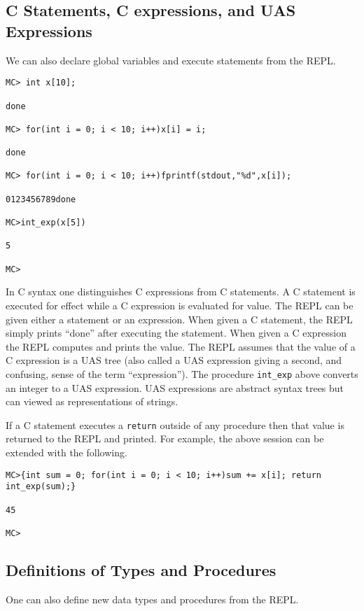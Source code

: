 \documentclass{article}
\begin{document}
\subsection{C Statements, C expressions, and UAS Expressions}

We can also declare global variables and execute statements from the REPL.

\begin{verbatim}
MC> int x[10];

done

MC> for(int i = 0; i < 10; i++)x[i] = i;

done

MC> for(int i = 0; i < 10; i++)fprintf(stdout,"%d",x[i]);

0123456789done

MC>int_exp(x[5])

5

MC>
\end{verbatim}

In C syntax one distinguishes C expressions from C statements.  A C
statement is executed for effect while a C expression is evaluated for
value. The REPL can be given either a statement or an expression.  When
given a C statement, the REPL simply prints ``done'' after executing
the statement.
When given a C expression the REPL computes and prints
the value.  The REPL assumes that the value of a C expression
is a UAS tree (also called a UAS expression giving a second, and confusing,
sense of the term ``expression''). The procedure {\tt int\_exp} above
converts an integer to a UAS expression.  UAS expressions are abstract
syntax trees but can viewed as representations of strings.

If a C statement executes a {\tt return} outside of any
procedure then that value is returned to the REPL and printed.
For example, the above session can be extended with the following.

\begin{verbatim}
MC>{int sum = 0; for(int i = 0; i < 10; i++)sum += x[i]; return int_exp(sum);}

45

MC>
\end{verbatim}

\subsection{Definitions of Types and Procedures}

One can also define new data types and procedures from the REPL.
\end{document}
